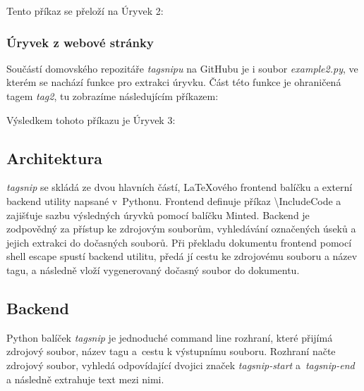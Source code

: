 \documentclass{article}
\begin{document}

Tento příkaz se přeloží na Úryvek 2:


\newpage

\subsubsection*{Úryvek z webové stránky}

Součástí domovského repozitáře \textit{tagsnipu} na GitHubu je i soubor \textit{example2.py}, 
ve kterém se nachází funkce pro extrakci úryvku. Část této funkce je ohraničená tagem \textit{tag2}, 
tu zobrazíme následujícím příkazem:


Výsledkem tohoto příkazu je Úryvek 3:


\subsection*{Architektura}

\textit{tagsnip} se skládá ze dvou hlavních částí,
\LaTeX{}ového frontend balíčku a externí backend utility napsané v~Pythonu.
Frontend definuje příkaz \textbackslash{}IncludeCode a zajišťuje sazbu výsledných úryvků pomocí balíčku Minted.
Backend je zodpovědný za přístup ke zdrojovým souborům, vyhledávání označených úseků a jejich extrakci do dočasných souborů.
Při překladu dokumentu frontend pomocí shell escape spustí backend utilitu,
předá jí cestu ke zdrojovému souboru a název tagu,
a následně vloží vygenerovaný dočasný soubor do dokumentu.

\subsection*{Backend}

Python balíček \textit{tagsnip} je jednoduché command line rozhraní,
které přijímá zdrojový soubor, název tagu a~cestu k výstupnímu souboru. 
Rozhraní načte zdrojový soubor, vyhledá odpovídající dvojici značek
\textit{tagsnip-start} a~\textit{tagsnip-end} a následně extrahuje text mezi nimi.
\end{document}
